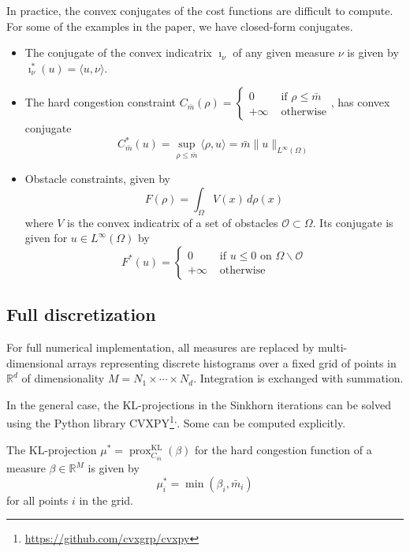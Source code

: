 \documentclass{article}
\newcommand{\RR}{\mathbb{R}}
\DeclareMathOperator{\KL}{KL}
\DeclareMathOperator{\prox}{prox}
\begin{document}
    
    \begin{remark}\label{rem:ConvexConj}
   	In practice, the convex conjugates of the cost functions are difficult to compute. For some of the examples in the paper, we have closed-form conjugates.
   	\begin{itemize}
   		\item The conjugate of the convex indicatrix $\imath_{\nu}$ of any given measure $\nu$ is given by $\imath_{\nu}^*(u) = \langle u, \nu\rangle$.
   		\item The hard congestion constraint $C_{\bar{m}}(\rho) = \begin{cases}
   		0&\text{ if }\rho\leq \bar{m} \\
   		+\infty&\text{ otherwise}
   		\end{cases}$, has convex conjugate
   		\[
   		C_{\bar{m}}^*(u) = \sup_{\rho\leq \bar{m}}{} \langle \rho, u\rangle = \bar{m}\|u\|_{L^\infty(\Omega)}
   		\]
   		\item Obstacle constraints, given by
   		\[
   		F(\rho) = \int_\Omega V(x)\,d\rho(x) 
   		\]
   		where $V$ is the convex indicatrix of a set of obstacles $\mathscr{O} \subset \Omega$. Its conjugate is given for $u\in L^\infty(\Omega)$ by
   		\[
   		F^*(u) = \begin{cases}
   		0& \text{ if } u \leq 0\text{ on }\Omega\backslash\mathscr{O} \\
   		+\infty& \text{ otherwise}
   		\end{cases}
   		\]
   	\end{itemize}
    \end{remark}
    
    
    
    
    \subsection{Full discretization}
    
    For full numerical implementation, all measures are replaced by multi-dimensional arrays representing discrete histograms over a fixed grid of points in $\RR^d$ of dimensionality $M = N_1\times\cdots\times N_d$. Integration is exchanged with summation.
    
    In the general case, the KL-projections in the Sinkhorn iterations can be solved using the Python library CVXPY\footnote{\url{https://github.com/cvxgrp/cvxpy}}\textsuperscript{,}. Some can be computed explicitly.
    
    
    \begin{remark}
    	The KL-projection $\mu^* = \prox^{\KL}_{C_{\bar{m}}}(\beta)$ for the hard congestion function of a measure $\beta\in\RR^M$ is given by
    	\begin{equation}
    		\mu^*_i
    		= \min(\beta_i,\bar{m}_i)
    	\end{equation}
    	for all points $i$ in the grid.
    	
    	
    \end{remark}
    
\end{document}
